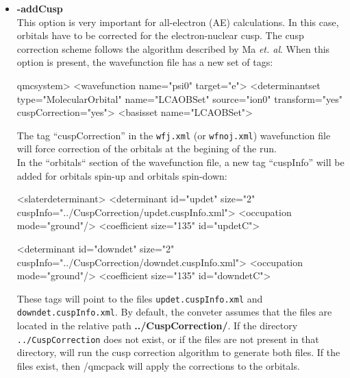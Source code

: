 \begin{itemize}
\begin{itemize}
\end{itemize}


\item \textbf{-addCusp} \\ This option is very important for
  all-electron (AE) calculations. In this case, orbitals have to be
  corrected for the electron-nuclear cusp. The cusp correction scheme
  follows the algorithm described by Ma \textit{et. al}. \cite{Ma2005}
  When this option is present, the wavefunction file has a new set of
  tags:

\begin{shade}
 qmcsystem>
  <wavefunction name="psi0" target="e">
    <determinantset type="MolecularOrbital" name="LCAOBSet" source="ion0"
      transform="yes" cuspCorrection="yes">
      <basisset name="LCAOBSet">
\end{shade}

The tag ``cuspCorrection'' in the \texttt{wfj.xml} (or \texttt{wfnoj.xml}) wavefunction file will force correction of the orbitals at the begining of the \qmcpack run. \\
In the ``orbitals`` section of the wavefunction file, a new tag ``cuspInfo'' will be added for orbitals spin-up and orbitals spin-down:

\begin{shade}
   <slaterdeterminant>
        <determinant id="updet" size="2"
            cuspInfo="../CuspCorrection/updet.cuspInfo.xml">
          <occupation mode="ground"/>
          <coefficient size="135" id="updetC">
          
  <determinant id="downdet" size="2"
           cuspInfo="../CuspCorrection/downdet.cuspInfo.xml">
          <occupation mode="ground"/>
          <coefficient size="135" id="downdetC">
\end{shade}

These tags will point to the files \texttt{updet.cuspInfo.xml} and
\texttt{downdet.cuspInfo.xml}. By default, the conveter assumes that
the files are located in the relative path
\textbf{../CuspCorrection/}. If the directory
\texttt{../CuspCorrection} does not exist, or if the files are not
present in that directory, \qmcpack will run the cusp correction
algorithm to generate both files.  If the files exist, then /qmcpack
will apply the corrections to the orbitals. \\


\end{itemize}
